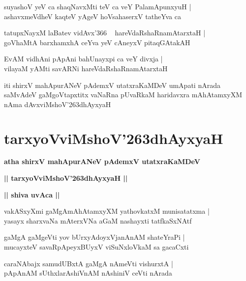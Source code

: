 \documentclass[twoside,12pt,openright]{book}
\def\S{\char'263}
\newcounter{shloka}[chapter]
\def\uvaca#1{\centerline{{\large\textbf{#1}}}}
\begin{document}
\begin{shloka}%
suyashoV yeV ca shaqNavxMti teV ca veY PalamApunxyuH |\\
ashavxmeVdheV kaqteV yAgeV hoVsahaserxV tatheYva ca 
\end{shloka}

\begin{shloka}%
tatupxNayxM laBatev vidAvx\char'366 ~ hareVdaRshaRnamAtarxtaH |\\
goVhaMtA barxhamxhA ceYva yeV cAneyxV pitaqGAtakAH 
\end{shloka}

\begin{shloka}%
EvAM vidhAni pApAni bahUnayxpi ca veY divxja |\\
vilayaM yAMti savARNi hareVdaRshaRnamAtarxtaH
\end{shloka}

\begin{center}
iti shirxV mahApurANeV pAdemxV utatxraKaMDeV  umApati nArada saMvAdeV gaMgoVtapxtitx vaNaRna 
pUvaRkaM haridavxra mAhAtamxyXM nAma dAvxviMshoV\S dhAyxyaH 
\end{center}

\chapter{tarxyoVviMshoV\S dhAyxyaH}

\begin{center}
{\LARGE\bfseries atha shirxV mahApurANeV pAdemxV utatxraKaMDeV} 
\end{center}

\begin{center}
{\LARGE\bfseries  || tarxyoVviMshoV\S dhAyxyaH ||}
\end{center}

\uvaca{|| shiva uvAca ||}

\begin{shloka}%
vakASxyXmi gaMgAmAhAtamxyXM yathovkatxM munisatatxma |\\
yasayx sharxvaNa mAterxVNa aGaM nashayxti tatfkaSxNAtf
\end{shloka}

\begin{shloka}%
gaMgA gaMgeVti yov bUrxyAdoyxVjanAnAM shateYraPi |\\
mucayxteV savaRpApeyxBUyxV viSuNxloVkaM sa gacaCxti 
\end{shloka}

\begin{shloka}%
caraNAbajx samudUBxtA gaMgA nAmeVti vishurxtA |\\
pApAnAM sUthxlarAshiVnAM nAshiniV ceVti nArada
\end{shloka}
\end{document}
